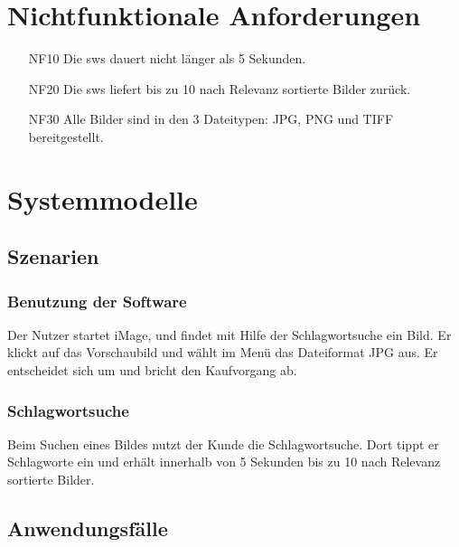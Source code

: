 \documentclass[parskip=full]{scrartcl}
\begin{document}
\section{Nichtfunktionale Anforderungen}
\begin{itemize}[nosep]
\item[NF10] Die \gls{sws} dauert nicht l\"anger als 5 Sekunden.
\item[NF20] Die \gls{sws} liefert bis zu 10 nach Relevanz sortierte Bilder zur\"uck.
\item[NF30] Alle Bilder sind in den 3 Dateitypen: JPG, PNG und TIFF bereitgestellt.
\end{itemize}

\section{Systemmodelle}

\subsection{Szenarien}
\subsubsection{Benutzung der Software}
Der Nutzer startet iMage, und findet mit Hilfe der Schlagwortsuche ein Bild. Er klickt auf das Vorschaubild und w\"ahlt im Men\"u das Dateiformat JPG aus. Er entscheidet sich um und bricht den Kaufvorgang ab.
\subsubsection{Schlagwortsuche}
Beim Suchen eines Bildes nutzt der Kunde die Schlagwortsuche. Dort tippt er Schlagworte ein und erh\"alt innerhalb von 5 Sekunden bis zu 10 nach Relevanz sortierte Bilder.
\subsection{Anwendungsfälle}
\end{document}
